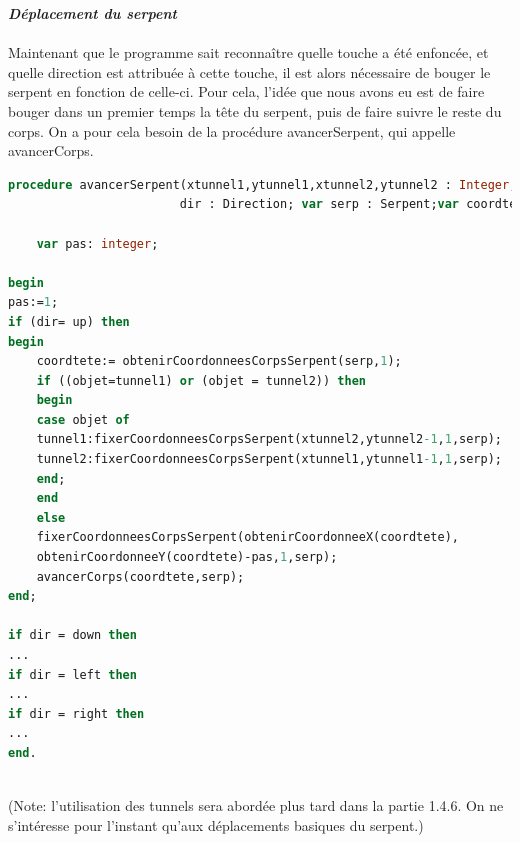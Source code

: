 \documentclass[11pt,a4paper]{article}
\begin{document}
         \textit{\textbf{Déplacement du serpent}}\\\\ 
Maintenant que le programme sait reconnaître quelle touche a été enfoncée, et quelle direction est attribuée à cette touche, il est alors nécessaire de bouger le serpent en fonction de celle-ci. Pour cela, l’idée que nous avons eu est de faire bouger dans un premier temps la tête du serpent, puis de faire suivre le reste du corps. On a pour cela besoin de la procédure avancerSerpent, qui appelle avancerCorps.
\scriptsize
        \begin{lstlisting}[language=Pascal,frame=single,caption=Code source de la procédure avancerSerpent]
procedure avancerSerpent(xtunnel1,ytunnel1,xtunnel2,ytunnel2 : Integer;objet : Contenus;
                        dir : Direction; var serp : Serpent;var coordtete : Position);
    
    var pas: integer;
                                                                                    
begin
pas:=1;
if (dir= up) then
begin
    coordtete:= obtenirCoordonneesCorpsSerpent(serp,1);
    if ((objet=tunnel1) or (objet = tunnel2)) then
    begin
    case objet of 
    tunnel1:fixerCoordonneesCorpsSerpent(xtunnel2,ytunnel2-1,1,serp);
    tunnel2:fixerCoordonneesCorpsSerpent(xtunnel1,ytunnel1-1,1,serp);
    end;
    end
    else
    fixerCoordonneesCorpsSerpent(obtenirCoordonneeX(coordtete),
    obtenirCoordonneeY(coordtete)-pas,1,serp);
    avancerCorps(coordtete,serp);
end;

if dir = down then
...
if dir = left then
...
if dir = right then 
...
end.
        
        \end{lstlisting}
        \normalsize
        (Note: l'utilisation des tunnels sera abordée plus tard dans la partie 1.4.6. On ne s'intéresse pour l'instant qu'aux déplacements basiques du serpent.)
        
\end{document}
